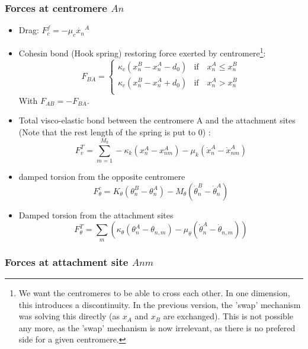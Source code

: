 \documentclass[a4paper,12pt]{article}
\renewcommand{\leq}{\leqslant}
\begin{document}
\subsubsection{Forces at centromere $An$}

\begin{itemize}
\item Drag: $F_c^f = -\mu_c \dot{x_n}^A$
\item Cohesin bond (Hook spring) restoring force exerted by
  centromere\footnote{We want the centromeres to be able to cross each
    other. In one dimension, this introduces a discontinuity. In the
    previous version, the 'swap' mechanism was solving this directly
    (as $x_A$ and $x_B$ are exchanged). This is not possible any more,
    as the 'swap' mechanism is now irrelevant, as there is no prefered
    side for a given centromere.}:
  \begin{equation}
    F_{BA} =
    \begin{cases}
      \kappa_c (x_n^B - x_n^A - d_0) &\mathrm{if}\quad x_n^A \leq x_n^B\\
      \kappa_c (x_n^B - x_n^A + d_0) &\mathrm{if}\quad  x_n^A > x_n^B\\
    \end{cases}
  \end{equation}
  With $F_{AB} = - F_{BA}$.
\item Total visco-elastic bond between the centromere A and the attachment
  sites (Note that the rest length of the spring is put to 0) :
  $$ F_v^T = \sum_{m = 1}^{M_k} -\kappa_k(x_n^A - x_{nm}^A)
  - \mu_k(\dot{x}_n^A - \dot{x}_{nm}^A) $$
\item damped torsion from the opposite centromere
  $$  F_\theta^c = K_{\theta} (\theta_{n}^B - \theta_{n}^A)
    - M_\theta \left(\dot{\theta}_{n}^B - \dot{\theta}_{n}^A \right) $$
\item Damped torsion from the attachment sites
  $$ F_\theta^T = \sum_m\left(\kappa_\theta(\theta_n^A - \theta_{n,m})
  - \mu_\theta \left(\dot{\theta}_n^A - \dot{\theta}_{n,m} \right)\right) $$
\end{itemize}


\subsubsection{Forces at attachment site $Anm$}
\end{document}
